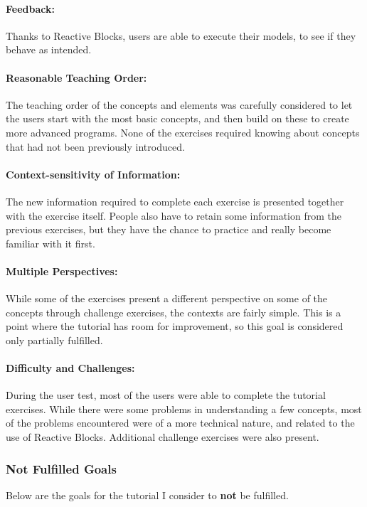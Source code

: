 \paragraph{Feedback:} Thanks to Reactive Blocks, users are able to execute their models, to see if they behave as intended.

\paragraph{Reasonable Teaching Order:} The teaching order of the concepts and elements was carefully considered to let the users start with the most basic concepts, and then build on these to create more advanced programs. None of the exercises required knowing about concepts that had not been previously introduced.

\paragraph{Context-sensitivity of Information:} The new information required to complete each exercise is presented together with the exercise itself. People also have to retain some information from the previous exercises, but they have the chance to practice and really become familiar with it first.

\paragraph{Multiple Perspectives:} While some of the exercises present a different perspective on some of the concepts through challenge exercises, the contexts are fairly simple. This is a point where the tutorial has room for improvement, so this goal is considered only partially fulfilled.

\paragraph{Difficulty and Challenges:} During the user test, most of the users were able to complete the tutorial exercises. While there were some problems in understanding a few concepts, most of the problems encountered were of a more technical nature, and related to the use of Reactive Blocks. Additional challenge exercises were also present.

\subsubsection{Not Fulfilled Goals}
Below are the goals for the tutorial I consider to \textbf{not} be fulfilled.

